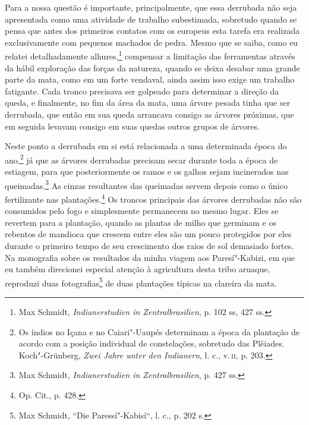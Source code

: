 Para a nossa questão é importante, principalmente, que essa derrubada
não seja apresentada como uma atividade de trabalho subestimada,
sobretudo quando se pensa que antes dos primeiros contatos com os
europeus esta tarefa era realizada exclusivamente com pequenos machados
de pedra. Mesmo que se saiba, como eu relatei detalhadamente
alhures,\footnote{Max Schmidt, \emph{Indianerstudien in
  Zentralbrasilien}, p. 102 ss, 427 ss.} compensar a limitação das
ferramentas através da hábil exploração das forças da natureza, quando
se deixa desabar uma grande parte da mata, como em um forte vendaval,
ainda assim isso exige um trabalho fatigante. Cada tronco precisava ser
golpeado para determinar a direção da queda, e finalmente, no fim da
área da mata, uma árvore pesada tinha que ser derrubada, que então em
sua queda arrancava consigo as árvores próximas, que em seguida levavam
consigo em suas quedas outros grupos de árvores.

Neste ponto a derrubada em si está relacionada a uma determinada época
do ano,\footnote{Os índios no Içana e no Caiari"-Uaupés determinam a época
  da plantação de acordo com a posição individual de constelações,
  sobretudo das Plêiades. Koch"-Grünberg, \emph{Zwei Jahre unter den
  Indianern}, l. c., v.\,\textsc{ii}, p. 203.} já que as árvores derrubadas
precisam secar durante toda a época de estiagem, para que
posteriormente os ramos e os galhos sejam incinerados nas
queimadas.\footnote{Max Schmidt, \emph{Indianerstudien in
  Zentralbrasilien}, p. 427 ss.} As cinzas resultantes das queimadas
servem depois como o único fertilizante nas plantações.\footnote{Op.
  Cit., p. 428.} Os troncos principais das árvores derrubadas não são
consumidos pelo fogo e simplesmente permanecem no mesmo lugar. Eles se
revertem para a plantação, quando as plantas de milho que germinam e os
rebentos de mandioca que crescem entre eles são um pouco protegidos
por eles durante o primeiro tempo de seu crescimento dos raios de sol
demasiado fortes. Na monografia sobre os resultados da minha viagem aos
Paresí"-Kabizi, em que eu também direcionei especial atenção à
agricultura desta tribo aruaque, reproduzi duas fotografias\footnote{Max
  Schmidt, ``Die Paressí"-Kabisí``, l. c., p. 202 s.} de duas plantações
típicas na clareira da mata.

